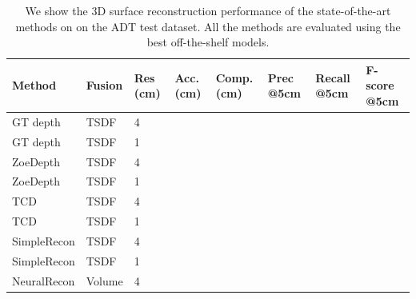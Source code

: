 \begin{table}[]
\centering
\small
\begin{tabular}{|p{2cm}|l|p{1cm}|p{1cm}|p{1cm}|p{1cm}|p{1cm}|p{1.1cm}|}
\hline
Method     & Fusion        & Res (cm) & Acc. (cm) & Comp. (cm) & Prec @5cm & Recall @5cm & F-score @5cm\\ \hline
GT depth   & TSDF       & 4                     &                &                  &         &      &   \\ \hline
GT depth   & TSDF        & 1                     &                &                   &         &       &   \\ \hline
ZoeDepth   & TSDF       & 4                     &                &                  &         &      &   \\ \hline
ZoeDepth   & TSDF        & 1                     &                &                   &         &       &   \\ \hline
TCD        & TSDF & 4                      &                     &                        &               &            &         \\ \hline
TCD        & TSDF & 1                      &                     &                        &               &            &         \\ \hline
SimpleRecon & TSDF          & 4                      &                     &                        &               &            &         \\ \hline
SimpleRecon & TSDF          & 1                      &                     &                        &               &            &         \\ \hline
NeuralRecon & Volume          & 4                      &                     &                        &               &            &         \\ \hline

\end{tabular}
\caption{We show the 3D surface reconstruction performance of the state-of-the-art methods on on the ADT test dataset. All the methods are evaluated using the best off-the-shelf models.}
\end{table}


